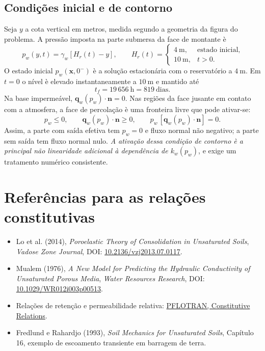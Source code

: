 \documentclass[11pt,a4paper]{article}
\begin{document}
\subsection{Condi\c{c}\~oes inicial e de contorno}

Seja $y$ a cota vertical em metros, medida segundo a geometria da
figura do problema. A press\~ao imposta na parte submersa da face
de montante \`e
\begin{equation*}
\boxed{p_w(y,t)=\gamma_w[H_r(t)-y],\qquad
H_r(t)=\begin{cases}
4\ \mathrm m,&\text{estado inicial},\\
10\ \mathrm m,&t>0.
\end{cases}}
\end{equation*}
O estado inicial $p_w(\mathbf x,0^-)$ \`e a solu\c{c}\~ao estacion\'aria
com o reservat\'orio a $4\ \mathrm m$. Em $t=0$ o n\'ivel \`e elevado
instantaneamente a $10\ \mathrm m$ e mantido at\'e
\begin{equation*}
\boxed{t_f=19\,656\ \mathrm h=819\ \mathrm{dias}.}
\end{equation*}
Na base imperme\'avel, $\mathbf q_w(p_w)\cdot\mathbf n=0$.
Nas regi\~oes da face jusante em contato com a atmosfera, a face
de percola\c{c}\~ao \`e uma fronteira livre que pode ativar-se:
\begin{equation*}
\boxed{p_w\leq0,\qquad
\mathbf q_w(p_w)\cdot\mathbf n\geq0,\qquad
p_w\,[\mathbf q_w(p_w)\cdot\mathbf n]=0.}
\end{equation*}
Assim, a parte com sa\'ida efetiva tem $p_w=0$ e fluxo normal
n\~ao negativo; a parte sem sa\'ida tem fluxo normal nulo.
\emph{A ativa\c{c}\~ao dessa condi\c{c}\~ao de contorno \`e a principal
n\~ao linearidade adicional \`a depend\^encia de $k_w(p_w)$},
e exige um tratamento num\'erico consistente.

\section*{Refer\^encias para as rela\c{c}\~oes constitutivas}

\begin{itemize}
\item Lo et al. (2014), \emph{Poroelastic Theory of Consolidation in Unsaturated Soils},
\emph{Vadose Zone Journal}, DOI: \href{https://doi.org/10.2136/vzj2013.07.0117}{10.2136/vzj2013.07.0117}.
\item Mualem (1976), \emph{A New Model for Predicting the Hydraulic Conductivity of Unsaturated Porous Media},
\emph{Water Resources Research}, DOI: \href{https://doi.org/10.1029/WR012i003p00513}{10.1029/WR012i003p00513}.
\item Rela\c{c}\~oes de reten\c{c}\~ao e permeabilidade relativa:
\href{https://documentation.pflotran.org/theory_guide/constitutive_relations.html}{PFLOTRAN, Constitutive Relations}.
\item Fredlund e Rahardjo (1993), \emph{Soil Mechanics for Unsaturated Soils},
Cap\'itulo 16, exemplo de escoamento transiente em barragem de terra.
\end{itemize}
\end{document}
